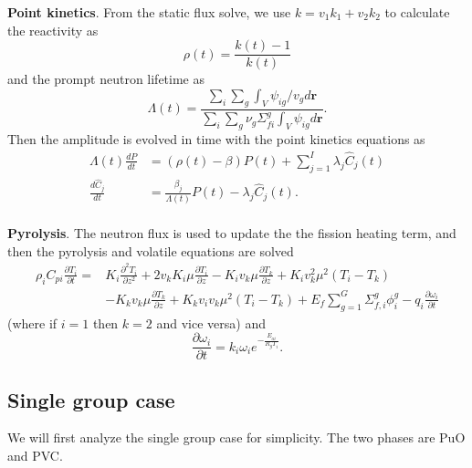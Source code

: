 \documentclass[12pt]{article}
\begin{document}
\noindent \textbf{Point kinetics}. From the static flux solve, we use $k=v_1k_1+v_2k_2$ to calculate the reactivity as 
\begin{equation}
    \rho (t) =\frac{k(t)-1}{k(t)}
\end{equation}
and the prompt neutron lifetime as 
\begin{equation}
    \Lambda (t)=\frac{\sum_i \sum_g \int_V \psi_{ig}/v_g d\mathbf{r}}{\sum_i \sum_g \nu_g \Sigma_{fi}^g\int_V \psi_{ig} d\mathbf{r}}.
\end{equation}
Then the amplitude is evolved in time with the point kinetics equations as
\begin{align}
    \Lambda (t)\frac{dP}{dt}&=(\rho(t)-\beta)P(t)+\sum_{j=1}^I\lambda_j \hat{C}_j (t)  \\ 
    \frac{d\hat{C}_j }{dt}&=\frac{\beta_j}{\Lambda (t)} P(t) -\lambda_j \hat{C}_j(t). 
\end{align}
\\
\textbf{Pyrolysis}. The neutron flux is used to update the the fission heating term, and then the pyrolysis and volatile equations are solved 
\begin{align}
    \rho_i C_{pi} \frac{\partial T_i}{\partial t}=& K_i \frac{\partial^2 T_i}{\partial z^2} +2v_k K_i \mu \frac{\partial T_i}{\partial z}-K_i v_k \mu \frac{\partial T_k}{\partial z} +K_i v_k ^2 \mu^2 (T_i -T_k)\\&-K_k v_k \mu \frac{\partial T_k}{\partial z} +K_k v_i v_k \mu^2 (T_i-T_k)  + E_f  \sum_{g=1}^G\Sigma_{f,i}^g \phi_{i}^g - q_i \frac{\partial \omega_i}{\partial t}
\end{align}
(where if $i=1$ then $k=2$ and vice versa) and 
\begin{equation}
   \frac{\partial \omega _i}{\partial t} = k_i \omega_i e^{-\frac{E_{ai}}{R_g T_i}} .
\end{equation}

\subsection{Single group case}
We will first analyze the single group case for simplicity. The two phases are PuO and PVC.
\end{document}
